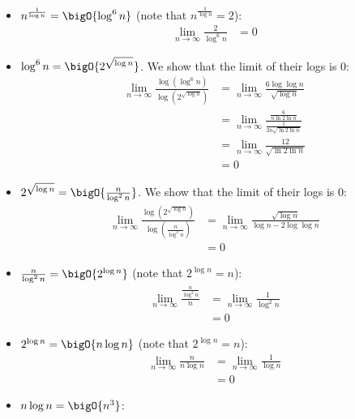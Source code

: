 \documentclass[final]{article}
\begin{document}
\begin{solution}
\begin{itemize}
        \item \(n^{\frac{1}{\log{n}}} =\bigO{\log^6{n}}\) (note that \(n^{\frac{1}{\log{n}}} = 2\)):
              \begin{align*}\lim_{n\to\infty}\frac{2}{\log^6{n}}
                   & = 0
              \end{align*}
        \item \(\log^6{n} = \bigO{2^{\sqrt{\log{n}}}}\). We show that the limit of their logs is 0:
              \begin{align*}\lim_{n\to\infty}\frac{\log\left(\log^6{n}\right)}{\log\left(2^{\sqrt{\log{n}}}\right)}
                   & = \lim_{n \to \infty}\frac{6\log\log{n}}{\sqrt{\log{n}}}                             \\
                   & = \lim_{n \to \infty}\frac{\frac{6}{n\ln{2}\ln{n}}}{\frac{1}{2n\sqrt{\ln{2}\ln{n}}}} \\
                   & = \lim_{n \to \infty}\frac{12}{\sqrt{\ln{2}\ln{n}}}                                  \\
                   & = 0
              \end{align*}
        \item \(2^{\sqrt{\log{n}}} = \bigO{\frac{n}{\log^2{n}}}\). We show that the limit of their logs is 0:
              \begin{align*}\lim_{n\to\infty}\frac{\log\left(2^{\sqrt{\log{n}}}\right)}{\log\left(\frac{n}{\log^2{n}}\right)}
                   & = \lim_{n \to \infty}\frac{\sqrt{\log{n}}}{\log{n} - 2\log\log{n}} \\
                   & = 0
              \end{align*}
        \item \(\frac{n}{\log^2{n}} = \bigO{2^{\log{n}}}\) (note that \(2^{\log{n}} = n\)):
              \begin{align*}\lim_{n\to\infty}\frac{\frac{n}{\log^2{n}}}{n}
                   & = \lim_{n\to\infty}\frac{1}{\log^2{n}} \\
                   & = 0
              \end{align*}
        \item \(2^{\log{n}} = \bigO{n\log{n}}\) (note that \(2^{\log{n}} = n\)):
              \begin{align*}\lim_{n\to\infty}\frac{n}{n\log{n}}
                   & = \lim_{n\to\infty}\frac{1}{\log{n}} \\
                   & = 0
              \end{align*}
        \item \(n\log{n} = \bigO{n^3}\):

\end{itemize}
\end{solution}
\end{document}
